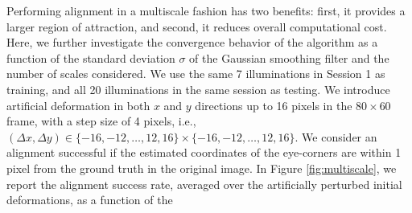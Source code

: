 \documentclass[12pt,journal,draftcls,letterpaper,onecolumn]{IEEEtran}
\begin{document}
Performing alignment in a multiscale fashion has two benefits: first, it provides a larger region of attraction, and second, it reduces overall computational cost. Here, we further investigate the convergence behavior of the algorithm as a function of the standard deviation $\sigma$ of the Gaussian smoothing filter and the number of scales considered.
We use the same 7 illuminations in
Session 1 as training, and all 20 illuminations in the same
session as testing. We introduce artificial deformation in
both $x$ and $y$ directions up to 16 pixels in the
$80\times 60$ frame, with a step size of 4 pixels, i.e.,
$(\Delta x, \Delta y) \in \{-16,-12,\ldots,12,16\} \times
\{-16,-12,\ldots,12,16\}$. We consider an alignment
successful if the estimated coordinates of the eye-corners
are within 1 pixel from the ground truth in the original
image.  In Figure \ref{fig:multiscale}, we report the
alignment success rate, averaged over the artificially
perturbed initial deformations, as a function of the
\end{document}
